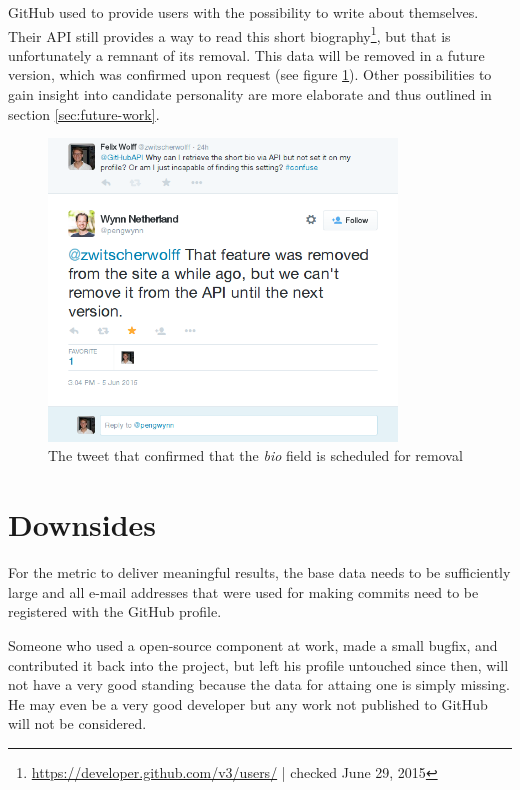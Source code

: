 GitHub used to provide users with the possibility to write about themselves. Their API still provides a way to read this short biography\footnote{\url{https://developer.github.com/v3/users/} | checked June 29, 2015}, but that is unfortunately a remnant of its removal. This data will be removed in a future version, which was confirmed upon request (see figure \ref{fig:gapitweet}). Other possibilities to gain insight into candidate personality are more elaborate and thus outlined in section \ref{sec:future-work}.

\begin{figure}
  \centering
  \includegraphics[width=25em]{gfx/githubapi_tweet.png}
  \caption{The tweet that confirmed that the \textit{bio} field is scheduled for removal}
  \label{fig:gapitweet}
\end{figure}

\section{Downsides}\label{sec:threatstovalidity}
For the metric to deliver meaningful results, the base data
needs to be sufficiently large and all e-mail addresses that were used for
making commits need to be registered with the GitHub profile.

Someone who used a open-source component at work, made a small bugfix,
and contributed it back into the project, but left his profile untouched
since then, will not have a very good standing because the data
for attaing one is simply missing. He may even be a very good developer
but any work not published to GitHub will not be considered.